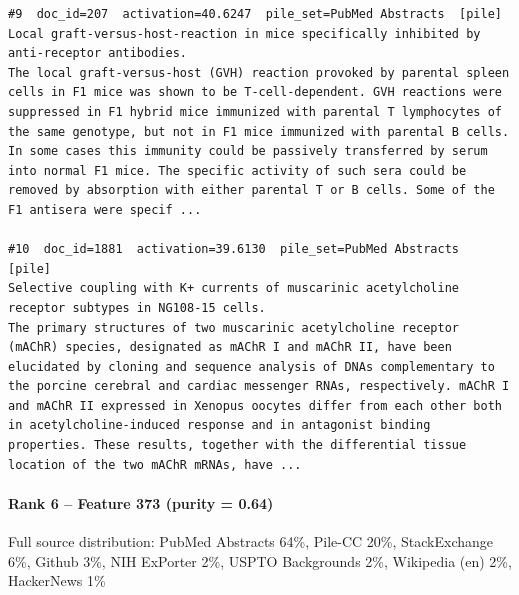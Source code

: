 \begin{verbatim}
#9  doc_id=207  activation=40.6247  pile_set=PubMed Abstracts  [pile]
Local graft-versus-host-reaction in mice specifically inhibited by anti-receptor antibodies.
The local graft-versus-host (GVH) reaction provoked by parental spleen cells in F1 mice was shown to be T-cell-dependent. GVH reactions were suppressed in F1 hybrid mice immunized with parental T lymphocytes of the same genotype, but not in F1 mice immunized with parental B cells. In some cases this immunity could be passively transferred by serum into normal F1 mice. The specific activity of such sera could be removed by absorption with either parental T or B cells. Some of the F1 antisera were specif ...

#10  doc_id=1881  activation=39.6130  pile_set=PubMed Abstracts  [pile]
Selective coupling with K+ currents of muscarinic acetylcholine receptor subtypes in NG108-15 cells.
The primary structures of two muscarinic acetylcholine receptor (mAChR) species, designated as mAChR I and mAChR II, have been elucidated by cloning and sequence analysis of DNAs complementary to the porcine cerebral and cardiac messenger RNAs, respectively. mAChR I and mAChR II expressed in Xenopus oocytes differ from each other both in acetylcholine-induced response and in antagonist binding properties. These results, together with the differential tissue location of the two mAChR mRNAs, have ...

\end{verbatim}

\paragraph*{Rank 6 -- Feature 373 (purity = 0.64)}

Full source distribution: PubMed Abstracts 64\%, Pile-CC 20\%, StackExchange 6\%, Github 3\%, NIH ExPorter 2\%, USPTO Backgrounds 2\%, Wikipedia (en) 2\%, HackerNews 1\%

